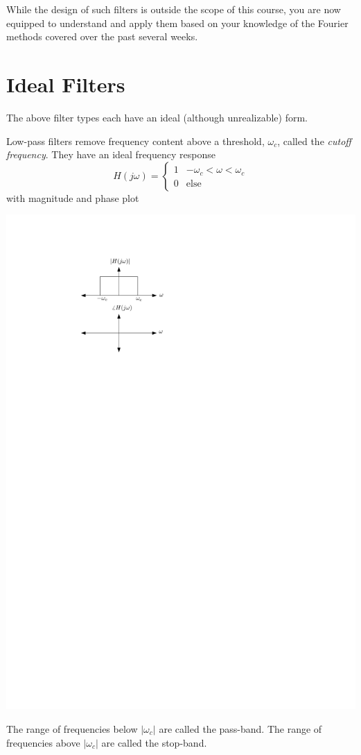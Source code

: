 While the design of such filters is outside the scope of this course, you are now equipped to understand and apply them based on your knowledge of the Fourier methods covered over the past several weeks.

\section{Ideal Filters}

The above filter types each have an ideal (although unrealizable) form.

Low-pass filters remove frequency content above a threshold, $\omega_c$, called the \emph{cutoff frequency}. They have an ideal frequency response
\[
H(j\omega) = \left\{ \begin{array}{lc}
  1 & -\omega_c < \omega < \omega_c\\
  0 & \text{else}
\end{array}
\right. 
\]
with magnitude and phase plot
\begin{center}
  \includegraphics[scale=1]{graphics/lowpass-ideal.pdf}
\end{center}
The range of frequencies below $|\omega_c|$ are called the pass-band. The range of frequencies above $|\omega_c|$ are called the stop-band.

